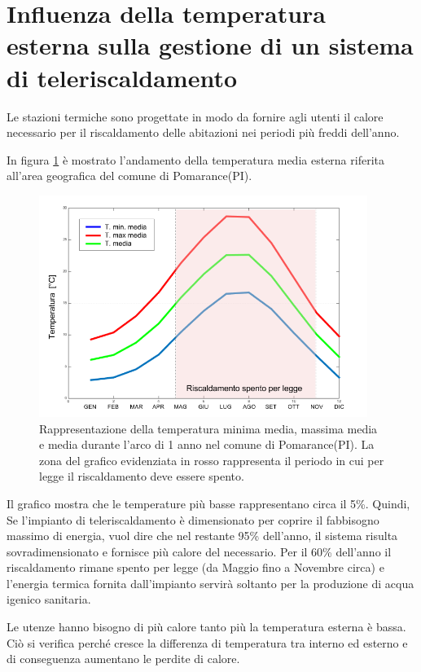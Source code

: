 \documentclass[laurea,oneside,11pt]{USiena_tesiLM}
\begin{document}
\section{Influenza della temperatura esterna sulla gestione di un sistema di teleriscaldamento}
Le stazioni termiche sono progettate in modo da fornire agli utenti il calore necessario per il riscaldamento delle abitazioni nei periodi più freddi dell'anno.

In figura \ref{fig:profilo_temp} è mostrato l'andamento della temperatura media esterna riferita all'area geografica del comune di Pomarance(PI).

\begin{figure}[!ht]
\centering
\includegraphics[width=0.95\textwidth]{figure/profilo_temp} 
\caption{Rappresentazione della temperatura minima media, massima media e media durante l'arco di 1 anno nel comune di Pomarance(PI). La zona del grafico evidenziata in rosso rappresenta il periodo in cui per legge il riscaldamento deve essere spento. }
\label{fig:profilo_temp}
\end{figure}

 Il grafico mostra che le temperature più basse rappresentano circa il 5\%. Quindi, Se l'impianto di teleriscaldamento è dimensionato per coprire il fabbisogno massimo di energia, vuol dire che nel restante 95\% dell'anno, il sistema risulta sovradimensionato e fornisce più calore del necessario.  Per il 60\% dell'anno il riscaldamento rimane spento per legge (da Maggio fino a Novembre circa) e l'energia termica fornita dall'impianto servirà soltanto per la produzione di acqua igenico sanitaria.

Le utenze hanno bisogno di più calore tanto più la temperatura esterna è bassa. Ciò si verifica perché cresce la differenza di temperatura tra interno ed esterno e di conseguenza aumentano le perdite di calore. 
\end{document}
